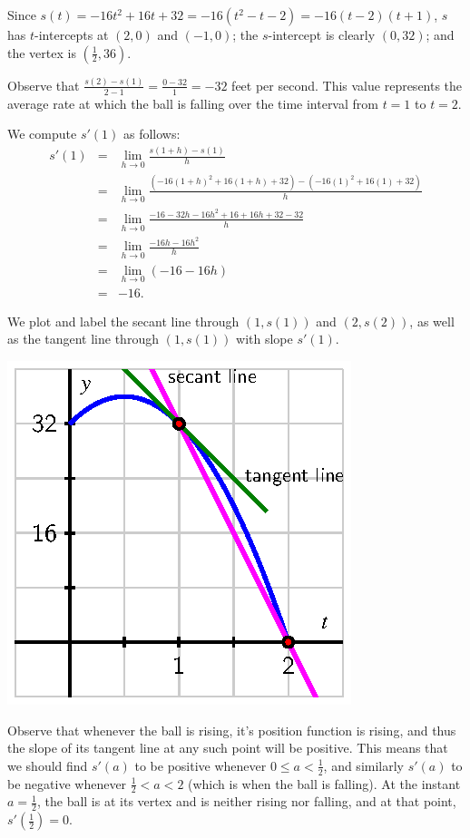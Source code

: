 \begin{activitySolution}
\ba
	\item Since $s(t) = -16t^2 + 16t + 32 = -16(t^2 - t - 2) = -16(t-2)(t+1)$, $s$ has $t$-intercepts at $(2,0)$ and $(-1,0)$; the $s$-intercept is clearly $(0,32)$; and the vertex is $(\frac{1}{2},36)$.
	\item Observe that $\frac{s(2)-s(1)}{2-1} = \frac{0 - 32}{1} = -32$ feet per second.  This value represents the average rate at which the ball is falling over the time interval from $t = 1$ to $t = 2$.
	\item We compute $s'(1)$ as follows:
	\begin{eqnarray*}
		s'(1) & = & \lim_{h \to 0} \frac{s(1+h)-s(1)}{h} \\
		       & = & \lim_{h \to 0} \frac{(-16(1+h)^2 + 16(1+h) + 32) - (-16(1)^2 + 16(1) + 32)}{h} \\
		       & = & \lim_{h \to 0} \frac{-16 - 32h - 16h^2 + 16 + 16h + 32 - 32}{h} \\
		       & = & \lim_{h \to 0} \frac{-16h - 16h^2}{h} \\
		       & = & \lim_{h \to 0} (-16-16h) \\
		       & = & -16.
	\end{eqnarray*}  
	\item We plot and label the secant line through $(1,s(1))$ and $(2,s(2))$, as well as the tangent line through $(1,s(1))$ with slope $s'(1)$.

	\includegraphics{figures/1_3_Act2Soln.eps}
	
	\item Observe that whenever the ball is rising, it's position function is rising, and thus the slope of its tangent line at any such point will be positive. This means that we should find $s'(a)$ to be positive whenever $0 \le a < \frac{1}{2}$, and similarly $s'(a)$ to be negative whenever $\frac{1}{2} < a < 2$ (which is when the ball is falling).  At the instant $a = \frac{1}{2}$, the ball is at its vertex and is neither rising nor falling, and at that point, $s'(\frac{1}{2}) = 0.$
\ea
\end{activitySolution}
\aftera